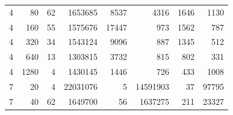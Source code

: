 \begin{table}[p]
\begin{minipage}[c]{0.49\textwidth}
\begin{tabular}{|rr|rr|rr|rr|}
\num{4} &   \num{80} & \num{62} & \num{1653685} &  \num{8537} &    \num{4316} & \num{1646} &    \num{1130} \\
\num{4} &  \num{160} & \num{55} & \num{1575676} & \num{17447} &     \num{973} & \num{1562} &     \num{787} \\
\num{4} &  \num{320} & \num{34} & \num{1543124} &  \num{9096} &     \num{887} & \num{1345} &     \num{512} \\
\num{4} &  \num{640} & \num{13} & \num{1303815} &  \num{3732} &     \num{815} &  \num{802} &     \num{331} \\
\num{4} & \num{1280} &  \num{4} & \num{1430145} &  \num{1446} &     \num{726} &  \num{433} &    \num{1008} \\
\hline
\num{7} &   \num{20} &  \num{4} & \num{22031076} &    \num{5} & \num{14591903} &  \num{37} & \num{97795} \\
\num{7} &   \num{40} & \num{62} &  \num{1649700} &   \num{56} &  \num{1637275} & \num{211} & \num{23327} \\

\end{tabular}
\end{minipage}
\end{table}
